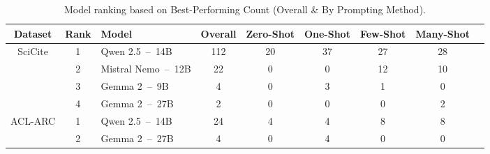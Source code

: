 \begin{table*}[t]
    \centering
    \footnotesize
    \begin{tabular}{cclcccccc}
      \hline
      \textbf{Dataset}            &  \textbf{Rank} &   \textbf{Model}          & \textbf{Overall}    & \textbf{Zero-Shot}  & \textbf{One-Shot} & \textbf{Few-Shot}  & \textbf{Many-Shot} \\
      \hline
      \multirow{4}{*}{SciCite}  & 1             &   Qwen 2.5~--~14B         & 112                               & 20                  &  37               & 27                 & 28                 \\
                                & 2             &   Mistral Nemo~--~12B     & 22                                & 0                   &  0                & 12                 & 10                 \\
                                & 3             &   Gemma 2~--~9B           & 4                                 & 0                   &  3                & 1                  & 0                  \\
                                & 4             &   Gemma 2~--~27B          & 2                                 & 0                   &  0                & 0                  & 2                  \\
      \hline
      \multirow{2}{*}{ACL-ARC}  & 1             &   Qwen 2.5~--~14B         & 24                          & 4                   &  4                & 8                  & 8                  \\
                                & 2             &   Gemma 2~--~27B          & 4                           & 0                   &  4                & 0                  & 0                  \\
      \hline
    \end{tabular}
    \caption{Model ranking based on Best-Performing Count (Overall \& By Prompting Method).}\label{tab:best_performer_evaluation}
\end{table*}

